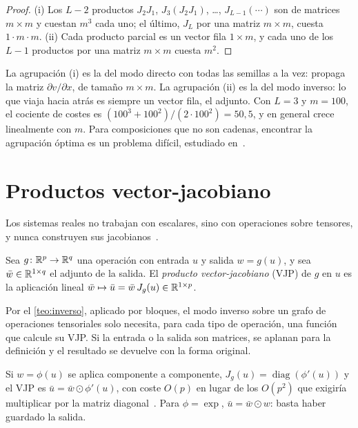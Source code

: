 \begin{proof}
(i) Los $L-2$ productos $J_2J_1$, $J_3(J_2J_1)$, \dots, $J_{L-1}(\cdots)$ son de matrices $m\times m$ y cuestan $m^{3}$ cada uno; el último, $J_L$ por una matriz $m\times m$, cuesta $1\cdot m\cdot m$. (ii) Cada producto parcial es un vector fila $1\times m$, y cada uno de los $L-1$ productos por una matriz $m\times m$ cuesta $m^{2}$.
\end{proof}

La agrupación (i) es la del modo directo con todas las semillas a la vez: propaga la matriz $\partial v/\partial x$, de tamaño $m\times m$. La agrupación (ii) es la del modo inverso: lo que viaja hacia atrás es siempre un vector fila, el adjunto. Con $L=3$ y $m=100$, el cociente de costes es $(100^{3}+100^{2})/(2\cdot 100^{2})=50{,}5$, y en general crece linealmente con $m$. Para composiciones que no son cadenas, encontrar la agrupación óptima es un problema difícil, estudiado en~\cite[cap.~9 y~10]{gw}.

\section{Productos vector-jacobiano}

Los sistemas reales no trabajan con escalares, sino con operaciones sobre tensores, y nunca construyen sus jacobianos~\cite{grosse}.

\begin{definicion}\label{def:vjp}
Sea $g\colon\mathbb{R}^{p}\to\mathbb{R}^{q}$ una operación con entrada $u$ y salida $w=g(u)$, y sea $\bar w\in\mathbb{R}^{1\times q}$ el adjunto de la salida. El \emph{producto vector-jacobiano} (VJP) de $g$ en $u$ es la aplicación lineal $\bar w\mapsto\bar u=\bar w\,J_g(u)\in\mathbb{R}^{1\times p}$.
\end{definicion}

Por el \cref{teo:inverso}, aplicado por bloques, el modo inverso sobre un grafo de operaciones tensoriales solo necesita, para cada tipo de operación, una función que calcule su VJP. Si la entrada o la salida son matrices, se aplanan para la definición y el resultado se devuelve con la forma original.

\begin{ejemplo}\label{ej:vjp-componente}
Si $w=\phi(u)$ se aplica componente a componente, $J_g(u)=\operatorname{diag}(\phi'(u))$ y el VJP es $\bar u=\bar w\odot\phi'(u)$, con coste $O(p)$ en lugar de los $O(p^{2})$ que exigiría multiplicar por la matriz diagonal~\cite{grosse}. Para $\phi=\exp$, $\bar u=\bar w\odot w$: basta haber guardado la salida.
\end{ejemplo}

